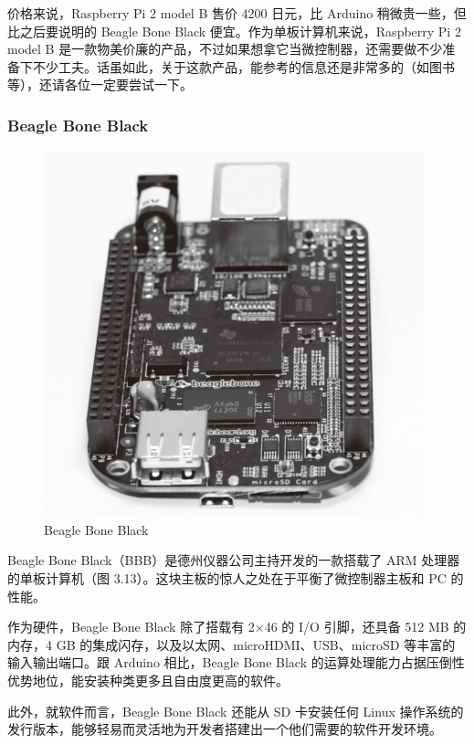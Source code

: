 \documentclass[12pt,UTF8]{ctexbook}
\begin{document}
价格来说，Raspberry Pi 2 model B 售价 4200 日元，比 Arduino 稍微贵一些，但比之后要说明的 Beagle Bone Black 便宜。作为单板计算机来说，Raspberry Pi 2 model B 是一款物美价廉的产品，不过如果想拿它当微控制器，还需要做不少准备下不少工夫。话虽如此，关于这款产品，能参考的信息还是非常多的（如图书等），还请各位一定要尝试一下。

\subsubsection{Beagle Bone Black}

\begin{figure}[htbp]
	\centering
	\includegraphics[width=1\linewidth]{64}
	\caption{Beagle Bone Black}
	\label{fig:1}
\end{figure}

Beagle Bone Black（BBB）是德州仪器公司主持开发的一款搭载了 ARM 处理器的单板计算机（图 3.13）。这块主板的惊人之处在于平衡了微控制器主板和 PC 的性能。

作为硬件，Beagle Bone Black 除了搭载有 2×46 的 I/O 引脚，还具备 512 MB 的内存，4 GB 的集成闪存，以及以太网、microHDMI、USB、microSD 等丰富的输入输出端口。跟 Arduino 相比，Beagle Bone Black 的运算处理能力占据压倒性优势地位，能安装种类更多且自由度更高的软件。

此外，就软件而言，Beagle Bone Black 还能从 SD 卡安装任何 Linux 操作系统的发行版本，能够轻易而灵活地为开发者搭建出一个他们需要的软件开发环境。
\end{document}
